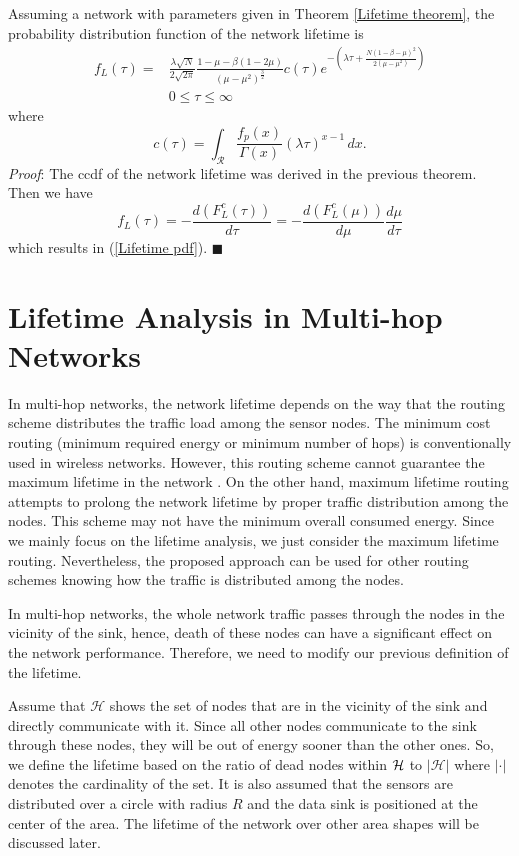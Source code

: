 \documentclass[conference]{IEEEtran}
\begin{document}
\corol \label{Corollary lifetime PDF} Assuming a network with
parameters given in Theorem \ref{Lifetime theorem}, the probability
distribution function of the network lifetime is
\begin{align}\label{Lifetime pdf}
f_L(\tau)=&\frac{\lambda\sqrt{N}}{2\sqrt{2\pi}} \frac{1-\mu-\beta( 1
- 2\mu) }{(\mu - \mu^2)^{\frac{3}{2}}} c(\tau) e^{-(\lambda \tau
+\frac{N(1-\beta -\mu)^2}{2(\mu - \mu^2)})} \nonumber \\
& 0\leq \tau \leq \infty
\end{align}
where
\begin{equation}
c(\tau) = \int_{\mathcal{R}} \frac{f_p(x)}{\Gamma(x)}(\lambda
\tau)^{x-1}\,dx.
\end{equation}
\textit{Proof}: The ccdf of the network lifetime was derived in the
previous theorem. Then we have
\begin{equation}
f_L(\tau)=
-\frac{d(F^c_L(\tau))}{d\tau}=-\frac{d(F^c_L(\mu))}{d\mu}\frac{d\mu}{d\tau}
\end{equation}
which results in (\ref{Lifetime pdf}). \hfill $\blacksquare$


\section{Lifetime Analysis in Multi-hop Networks} \label{Section lifetime pdf multi-hop}
In multi-hop networks, the network lifetime depends on the way that
the routing scheme distributes the traffic load among the sensor
nodes. The minimum cost routing (minimum required energy or minimum
number of hops) is conventionally used in wireless networks.
However, this routing scheme cannot guarantee the maximum lifetime
in the network \cite{Al-Karaki_Routing_Magazine2004}. On the other
hand, maximum lifetime routing attempts to prolong the network
lifetime by proper traffic distribution among the nodes. This scheme
may not have the minimum overall consumed energy. Since we mainly
focus on the lifetime analysis, we just consider the maximum
lifetime routing. Nevertheless, the proposed approach can be used for other routing schemes knowing how the traffic is distributed among the nodes.

In multi-hop networks, the whole network traffic passes through the
nodes in the vicinity of the sink, hence, death of these nodes can
have a significant effect on the network performance. Therefore, we
need to modify our previous definition of the lifetime.

Assume that $\mathcal{H}$ shows the set of nodes that are in the
vicinity of the sink and directly communicate with it. Since all
other nodes communicate to the sink through these nodes, they will
be out of energy sooner than the other ones. So, we define the
lifetime based on the ratio of dead nodes within $\cal{H}$ to $\vert
\mathcal{H} \vert$ where $\vert \cdot \vert$ denotes the cardinality
of the set. It is also assumed that the sensors are distributed over
a circle with radius $R$ and the data sink is positioned at the
center of the area. The lifetime of the network over other area
shapes will be discussed later.
\end{document}
